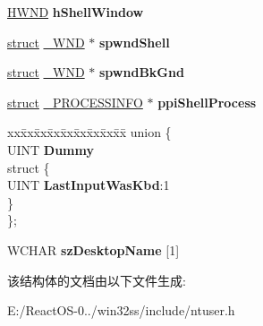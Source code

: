 \begin{DoxyCompactItemize}
\item 
\mbox{\label{struct___d_e_s_k_t_o_p_i_n_f_o_abd0c0e4dc20779efe5dc5bfce4bf35ff}} 
\hyperlink{interfacevoid}{H\+W\+ND} {\bfseries h\+Shell\+Window}
\item 
\mbox{\label{struct___d_e_s_k_t_o_p_i_n_f_o_a3bd378a0a3b548876e84f15373eb2cd8}} 
\hyperlink{interfacestruct}{struct} \hyperlink{struct___w_n_d}{\+\_\+\+W\+ND} $\ast$ {\bfseries spwnd\+Shell}
\item 
\mbox{\label{struct___d_e_s_k_t_o_p_i_n_f_o_a88fab626d1ee7affa6f876da1ac15036}} 
\hyperlink{interfacestruct}{struct} \hyperlink{struct___w_n_d}{\+\_\+\+W\+ND} $\ast$ {\bfseries spwnd\+Bk\+Gnd}
\item 
\mbox{\label{struct___d_e_s_k_t_o_p_i_n_f_o_aca9925b596f429f9182ca62a57c65bd7}} 
\hyperlink{interfacestruct}{struct} \hyperlink{struct___p_r_o_c_e_s_s_i_n_f_o}{\+\_\+\+P\+R\+O\+C\+E\+S\+S\+I\+N\+FO} $\ast$ {\bfseries ppi\+Shell\+Process}
\item 
\mbox{\label{struct___d_e_s_k_t_o_p_i_n_f_o_aec407740f163a2dcfc87c25099ecba19}} 
\begin{tabbing}
xx\=xx\=xx\=xx\=xx\=xx\=xx\=xx\=xx\=\kill
union \{\\
\>UINT {\bfseries Dummy}\\
\mbox{\label{union___d_e_s_k_t_o_p_i_n_f_o_1_1_0D3761_a75e79ff19b64fa24f2551ab327433976}} 
\>struct \{\\
\>\>UINT {\bfseries LastInputWasKbd}:1\\
\>\} \\
\}; \\

\end{tabbing}\item 
\mbox{\label{struct___d_e_s_k_t_o_p_i_n_f_o_a59edbaf6d0f6526002b46aaeeda6a9ce}} 
W\+C\+H\+AR {\bfseries sz\+Desktop\+Name} \mbox{[}1\mbox{]}
\end{DoxyCompactItemize}


该结构体的文档由以下文件生成\+:\begin{DoxyCompactItemize}
\item 
E\+:/\+React\+O\+S-\/0../win32ss/include/ntuser.\+h\end{DoxyCompactItemize}
